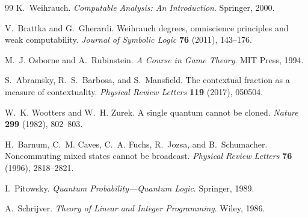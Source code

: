 \documentclass[11pt]{article}
\theoremstyle{plain}
\theoremstyle{definition}
\theoremstyle{remark}
\begin{document}
\begin{thebibliography}{99}
K.~Weihrauch. \emph{Computable Analysis: An Introduction}. Springer, 2000.


V.~Brattka and G.~Gherardi. Weihrauch degrees, omniscience principles and weak
computability. \emph{Journal of Symbolic Logic} \textbf{76} (2011), 143--176.

M.~J. Osborne and A.~Rubinstein. \emph{A Course in Game Theory}. MIT Press,
1994.

S.~Abramsky, R.~S.~Barbosa, and S.~Mansfield. The contextual fraction as a
measure of contextuality. \emph{Physical Review Letters} \textbf{119} (2017),
050504.

W.~K. Wootters and W.~H. Zurek. A single quantum cannot be cloned.
\emph{Nature} \textbf{299} (1982), 802--803.

H.~Barnum, C.~M. Caves, C.~A. Fuchs, R.~Jozsa, and B.~Schumacher.
Noncommuting mixed states cannot be broadcast. \emph{Physical Review Letters}
\textbf{76} (1996), 2818--2821.

I.~Pitowsky. \emph{Quantum Probability---Quantum Logic}. Springer, 1989.


A.~Schrijver. \emph{Theory of Linear and Integer Programming}. Wiley, 1986.

\end{thebibliography}
\end{document}
